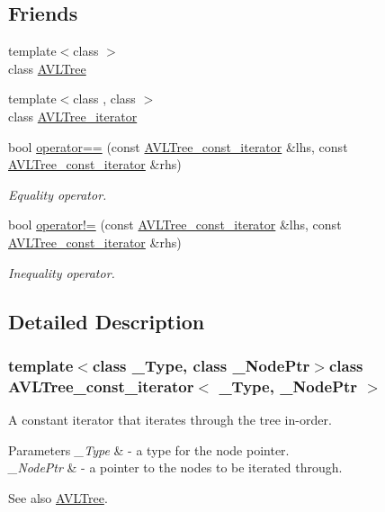 \subsection*{Friends}
\begin{DoxyCompactItemize}
\item 
{\footnotesize template$<$class $>$ }\\class \hyperlink{class_a_v_l_tree__const__iterator_aa926bd8d1e26ee32ade14a311ebf8df5}{A\+V\+L\+Tree}
\item 
{\footnotesize template$<$class , class $>$ }\\class \hyperlink{class_a_v_l_tree__const__iterator_a3b97d3835e767e85b1cededfeefa9d84}{A\+V\+L\+Tree\+\_\+iterator}
\item 
bool \hyperlink{class_a_v_l_tree__const__iterator_aa8f8a38cc48dccdbf336f2e44dbf084c}{operator==} (const \hyperlink{class_a_v_l_tree__const__iterator}{A\+V\+L\+Tree\+\_\+const\+\_\+iterator} \&lhs, const \hyperlink{class_a_v_l_tree__const__iterator}{A\+V\+L\+Tree\+\_\+const\+\_\+iterator} \&rhs)
\begin{DoxyCompactList}\small\item\em Equality operator. \end{DoxyCompactList}\item 
bool \hyperlink{class_a_v_l_tree__const__iterator_affd846c45384c4c538ae133d9723ffa4}{operator!=} (const \hyperlink{class_a_v_l_tree__const__iterator}{A\+V\+L\+Tree\+\_\+const\+\_\+iterator} \&lhs, const \hyperlink{class_a_v_l_tree__const__iterator}{A\+V\+L\+Tree\+\_\+const\+\_\+iterator} \&rhs)
\begin{DoxyCompactList}\small\item\em Inequality operator. \end{DoxyCompactList}\end{DoxyCompactItemize}


\subsection{Detailed Description}
\subsubsection*{template$<$class \+\_\+\+Type, class \+\_\+\+Node\+Ptr$>$class A\+V\+L\+Tree\+\_\+const\+\_\+iterator$<$ \+\_\+\+Type, \+\_\+\+Node\+Ptr $>$}

A constant iterator that iterates through the tree in-\/order. 


\begin{DoxyParams}{Parameters}
{\em \+\_\+\+Type} & -\/ a type for the node pointer. \\
\hline
{\em \+\_\+\+Node\+Ptr} & -\/ a pointer to the nodes to be iterated through. \\
\hline
\end{DoxyParams}
\begin{DoxySeeAlso}{See also}
\hyperlink{class_a_v_l_tree}{A\+V\+L\+Tree}. 
\end{DoxySeeAlso}


